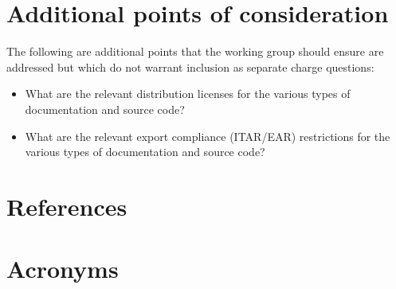 \documentclass[SE,authoryear,toc]{lsstdoc}
\begin{document}
\appendix
\section{Additional points of consideration}
The following are additional points that the working group should ensure are addressed but which do not warrant inclusion as separate charge questions:

\begin{itemize}
\item What are the relevant distribution licenses for the various types of documentation and source code?
\item What are the relevant export compliance (ITAR/EAR) restrictions for the various types of documentation and source code?
\end{itemize}

\section{References} 
\label{sec:bib}


\section{Acronyms} \label{sec:acronyms}

\printglossaries
\end{document}
